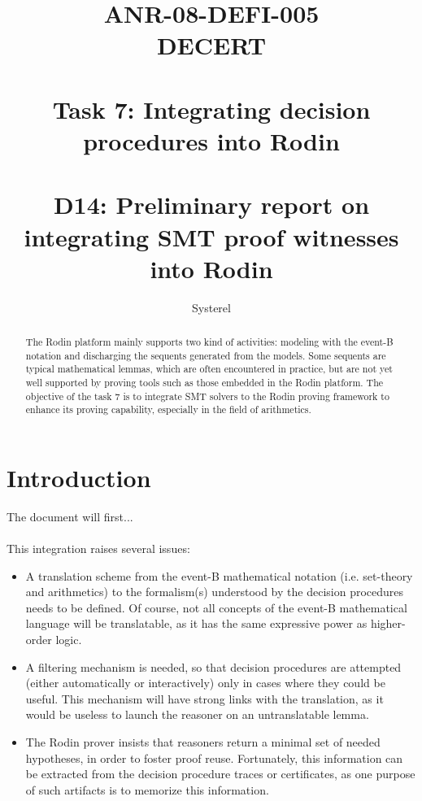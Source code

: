 \documentclass[10pt,a4paper]{report}
\title{ANR-08-DEFI-005 \\ DECERT \\ ~ \\ Task 7: Integrating decision procedures into Rodin \\ ~ \\ D14: Preliminary report on integrating SMT proof witnesses into Rodin}
\author{Systerel}
\begin{document}
\maketitle

\begin{abstract}

The Rodin platform \cite{RODIN} mainly supports two kind of activities: modeling with the event-B notation and discharging the sequents generated from the models. 
Some sequents are typical mathematical lemmas, which are often encountered in practice, but are not yet well supported by proving tools such as those embedded in the Rodin platform.
The objective of the task 7 is to integrate SMT solvers to the Rodin proving framework to enhance its proving capability, especially in the field of arithmetics.

\end{abstract}

\tableofcontents

\section{Introduction}
The document will first...

\paragraph{}
This integration raises several issues:
\begin{itemize}
\item A translation scheme from the event-B mathematical notation (i.e. set-theory and arithmetics) to the formalism(s) understood by the decision procedures needs to be defined. Of course, not all
concepts of the event-B mathematical language will be translatable, as it has the same expressive
power as higher-order logic.
\item A filtering mechanism is needed, so that decision procedures are attempted (either automatically or interactively) only in cases where they could be useful. This mechanism will have strong links with the translation, as it would be useless to launch the reasoner on an untranslatable lemma.
\item The Rodin prover insists that reasoners return a minimal set of needed hypotheses, in order to foster proof reuse. Fortunately, this information can be extracted from the decision procedure
traces or certificates, as one purpose of such artifacts is to memorize this information.
\end{itemize}
\end{document}
